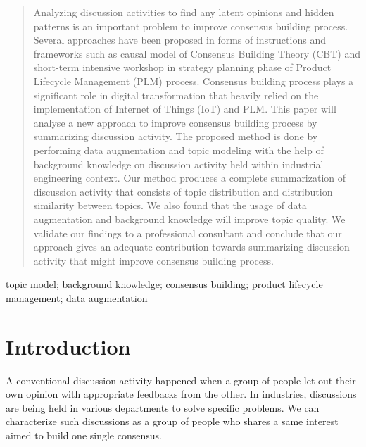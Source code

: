 \documentclass[10pt, conference, compsocconf]{IEEEtran}
\begin{document}
\begin{abstract}
Analyzing discussion activities to find any latent opinions and hidden patterns is an important problem to improve consensus building process. Several approaches have been proposed in forms of instructions and frameworks such as causal model of Consensus Building Theory (CBT) and short-term intensive workshop in strategy planning phase of Product Lifecycle Management (PLM) process. Consensus building process plays a significant role in digital transformation that heavily relied on the implementation of Internet of Things (IoT) and PLM. This paper will analyse a new approach to improve consensus building process by summarizing discussion activity. The proposed method is done by performing data augmentation and topic modeling with the help of background knowledge on discussion activity held within industrial engineering context. Our method produces a complete summarization of discussion activity that consists of topic distribution and distribution similarity between topics. We also found that the usage of data augmentation and background knowledge will improve topic quality. We validate our findings to a professional consultant and conclude that our approach gives an adequate contribution towards summarizing discussion activity that might improve consensus building process.
\end{abstract}

\begin{IEEEkeywords}
topic model; background knowledge; consensus building; product lifecycle management; data augmentation

\end{IEEEkeywords}


%
\IEEEpeerreviewmaketitle



\section{Introduction}
A conventional discussion activity happened when a group of people let out their own opinion with appropriate feedbacks from the other. In industries, discussions are being held in various departments to solve specific problems. We can characterize such discussions as a group of people who shares a same interest aimed to build one single consensus.
 
\end{document}
